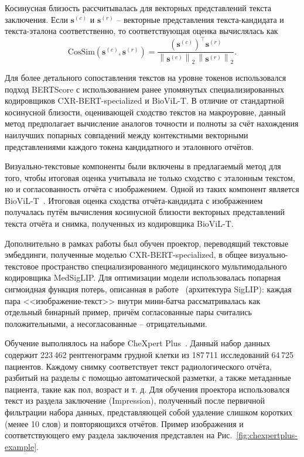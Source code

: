 Косинусная близость рассчитывалась для векторных представлений текста заключения. Если $\mathbf{s}^{(c)}$ и $\mathbf{s}^{(r)}$ -- векторные представления текста-кандидата и текста-эталона соответственно, то соответствующая оценка вычислялась как
\[
\mathrm{CosSim}\!\left(\mathbf{s}^{(c)}, \mathbf{s}^{(r)}\right)
=
\frac{\left(\mathbf{s}^{(c)}\right)^{\top}\mathbf{s}^{(r)}}
{\left\|\mathbf{s}^{(c)}\right\|_2\,\left\|\mathbf{s}^{(r)}\right\|_2}.
\]

Для более детального сопоставления текстов на уровне токенов использовался подход BERTScore с использованием ранее упомянутых специализированных кодировщиков CXR-BERT-specialized и BioViL-T. В отличие от стандартной косинусной близости, оценивающей сходство текстов на макроуровне, данный метод предполагает вычисление аналогов точности и полноты за счёт нахождения наилучших попарных совпадений между контекстными векторными представлениями каждого токена кандидатного и эталонного отчётов.

Визуально-текстовые компоненты были включены в предлагаемый метод для того, чтобы итоговая оценка учитывала не только сходство с эталонным текстом, но и согласованность отчёта с изображением. Одной из таких компонент является BioViL-T~\cite{bannur2023learning}. Итоговая оценка сходства отчёта-кандидата с изображением получалась путём вычисления косинусной близости векторных представлений текста отчёта и снимка, полученных из кодировщика BioViL-T.

Дополнительно в рамках работы был обучен проектор, переводящий текстовые эмбеддинги, полученные моделью CXR-BERT-specialized, в общее визуально-текстовое пространство специализированного медицинского мультимодального кодировщика MedSigLIP. Для оптимизации модели использовалась попарная сигмоидная функция потерь, описанная в работе~\cite{zhai2023siglip} (архитектура SigLIP): каждая пара <<изображение-текст>> внутри мини-батча рассматривалась как отдельный бинарный пример, причём согласованные пары считались положительными, а несогласованные -- отрицательными.

Обучение выполнялось на наборе CheXpert Plus~\cite{chambon2024chexpertplus}. Данный набор данных содержит 223\,462 рентгенограмм грудной клетки из 187\,711 исследований 64\,725 пациентов. Каждому снимку соответствует текст радиологического отчёта, разбитый на разделы с помощью автоматической разметки, а также метаданные пациента, такие как пол, возраст и т. д. Для обучения проектора использовался текст из раздела заключение (Impression), полученный после первичной фильтрации набора данных, представляющей собой удаление слишком коротких (менее 10 слов) и повторяющихся отчётов. Пример изображения и соответствующего ему раздела заключения представлен на Рис.~\ref{fig:chexpertplus-example}.

